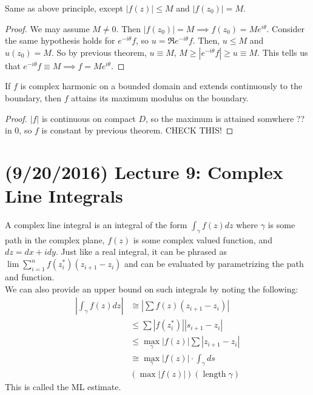 \documentclass[11pt,leqno,oneside]{amsart}
\begin{document}
  \begin{thm}
    Same as above principle, except $|f(z)| \leq M$ and $|f(z_0)| =
    M$.
  \end{thm}
  \begin{proof}
    We may assume $M \neq 0$. Then $|f(z_0)| = M \implies f(z_0) =
    Me^{i\theta}$. Consider the same hypothesis holds for
    $e^{-i\theta}f$, so $u = \Re e^{-i\theta}f$. Then, $u \leq M$ and
    $u(z_0) = M$. So by previous theorem, $u \equiv M$, $M \geq
    |e^{-i\theta}f| \geq u \equiv M$. This tells us that
    $e^{-i\theta}f \equiv M \implies f = Me^{i\theta}$.
  \end{proof}
  \begin{thm}
    If $f$ is complex harmonic on a bounded domain and extends
    continuously to the boundary, then $f$ attains its maximum modulus
    on the boundary.
  \end{thm}
  \begin{proof}
    $|f|$ is continuous on compact $D$, so the maximum is attained
    somwhere ?? in 0, so $f$ is constant by previous theorem. CHECK THIS!
  \end{proof}
  \section{(9/20/2016) Lecture 9: Complex Line Integrals}
  A complex line integral is an integral of the form $\int_\gamma
  f(z)dz$ where $\gamma$ is some path in the complex plane, $f(z)$ is
  some complex valued function, and $dz = dx + idy$. Just like a real
  integral, it can be phrased as $\lim \sum_{i=1}^n
  f(z_i^*)(z_{i+1}-z_i)$ and can be evaluated by parametrizing the
  path and function. \\

  We can also provide an upper bound on such integrals by noting the
  following:
  \begin{align*}
    |\int_\gamma f(z)dz | & \cong |\sum f(z)(z_{i+1}-z_i)| \\
    \ & \leq \sum |f(z_i^*)||s_{i+1}-z_i| \\
    \ & \leq \max_\gamma |f(z)| \sum |z_{i+1}-z_i| \\
    \ & \cong \max_\gamma |f(z)| \cdot \int_\gamma ds \\
    \ & (\max |f(z)|)(\operatorname{length} \gamma)
  \end{align*}
  This is called the ML estimate.
\end{document}
